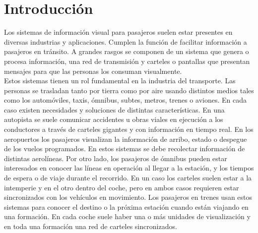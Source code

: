 
\newcommand{\keyword}[1]{\textbf{#1}}
\newcommand{\tabhead}[1]{\textbf{#1}}
\newcommand{\code}[1]{\texttt{#1}}
\newcommand{\file}[1]{\texttt{\bfseries#1}}
\newcommand{\option}[1]{\texttt{\itshape#1}}
\newcommand{\grados}{$^{\circ}$}



\chapter{Introducción} %
\label{Chapter1} %
\label{Intro}

Los sistemas de información visual para pasajeros suelen estar presentes en diversas industrias y aplicaciones. Cumplen la función de facilitar información a pasajeros en tránsito. A grandes rasgos se componen de un sistema que genera o procesa información, una red de transmisión y carteles o pantallas que presentan mensajes para que las personas los consuman visualmente.\\

 Estos sistemas tienen un rol fundamental en la industria del transporte. Las personas se trasladan tanto por tierra como por aire usando distintos medios tales como los automóviles, taxis, ómnibus, subtes, metros, trenes  o aviones. En cada caso existen necesidades y soluciones de distintas características. En una autopista se suele comunicar accidentes u obras viales en ejecución a los conductores a través de carteles gigantes y con información en tiempo real. En los aeropuertos los pasajeros visualizan la información de arribo, estado o despegue de los vuelos programados. En estos sistemas se debe recolectar información de distintas aerolíneas. Por otro lado, los pasajeros de ómnibus pueden estar interesados en conocer las líneas en operación al llegar a la estación, y los tiempos de espera o de viaje durante el recorrido. En un caso los carteles suelen estar a la intemperie y en el otro dentro del coche, pero en ambos casos requieren estar sincronizados con los vehículos en movimiento. Los pasajeros en trenes usan estos sistemas para conocer el destino o la próxima estación cuando están viajando en una formación. En cada coche suele haber una o más unidades de visualización y en toda una formación una red de carteles sincronizados. \\

